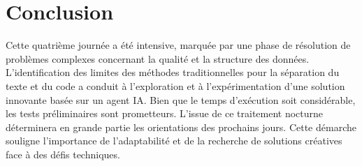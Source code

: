 \documentclass[12pt, a4paper]{article}
\begin{document}
\section{Conclusion}
Cette quatrième journée a été intensive, marquée par une phase de résolution de problèmes complexes concernant la qualité et la structure des données. L'identification des limites des méthodes traditionnelles pour la séparation du texte et du code a conduit à l'exploration et à l'expérimentation d'une solution innovante basée sur un agent IA. Bien que le temps d'exécution soit considérable, les tests préliminaires sont prometteurs. L'issue de ce traitement nocturne déterminera en grande partie les orientations des prochains jours. Cette démarche souligne l'importance de l'adaptabilité et de la recherche de solutions créatives face à des défis techniques.
\end{document}
